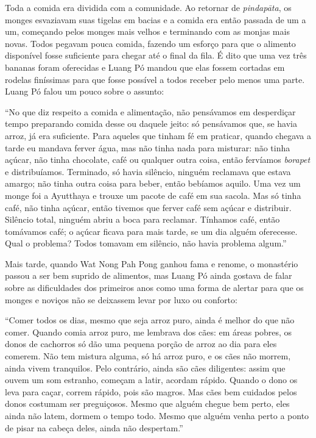 Toda a comida era dividida com a comunidade. Ao retornar de
\emph{pindapāta}, os monges esvaziavam suas tigelas em bacias e a comida
era então passada de um a um, começando pelos monges mais velhos e
terminando com as monjas mais novas. Todos pegavam pouca comida, fazendo
um esforço para que o alimento disponível fosse suficiente para chegar
até o final da fila. É dito que uma vez três bananas foram oferecidas e
Luang Pó mandou que elas fossem cortadas em rodelas finíssimas para que
fosse possível a todos receber pelo menos uma parte. Luang Pó falou um
pouco sobre o assunto:

``No que diz respeito a comida e alimentação, não pensávamos em
desperdiçar tempo preparando comida desse ou daquele jeito: só
pensávamos que, se havia arroz, já era suficiente. Para aqueles que
tinham fé em praticar, quando chegava a tarde eu mandava ferver água,
mas não tinha nada para misturar: não tinha açúcar, não tinha chocolate,
café ou qualquer outra coisa, então fervíamos \emph{borapet} e
distribuíamos. Terminado, só havia silêncio, ninguém reclamava que
estava amargo; não tinha outra coisa para beber, então bebíamos aquilo.
Uma vez um monge foi a Ayutthaya e trouxe um pacote de café em sua
sacola. Mas só tinha café, não tinha açúcar, então tivemos que ferver
café sem açúcar e distribuir. Silêncio total, ninguém abriu a boca para
reclamar. Tínhamos café, então tomávamos café; o açúcar ficava para mais
tarde, se um dia alguém oferecesse. Qual o problema? Todos tomavam em
silêncio, não havia problema algum.''

Mais tarde, quando Wat Nong Pah Pong ganhou fama e renome, o monastério
passou a ser bem suprido de alimentos, mas Luang Pó ainda gostava de
falar sobre as dificuldades dos primeiros anos como uma forma de alertar
para que os monges e noviços não se deixassem levar por luxo ou
conforto:

``Comer todos os dias, mesmo que seja arroz puro, ainda é melhor do que
não comer. Quando comia arroz puro, me lembrava dos cães: em áreas
pobres, os donos de cachorros só dão uma pequena porção de arroz ao dia
para eles comerem. Não tem mistura alguma, só há arroz puro, e os cães
não morrem, ainda vivem tranquilos. Pelo contrário, ainda são cães
diligentes: assim que ouvem um som estranho, começam a latir, acordam
rápido. Quando o dono os leva para caçar, correm rápido, pois são
magros. Mas cães bem cuidados pelos donos costumam ser preguiçosos.
Mesmo que alguém chegue bem perto, eles ainda não latem, dormem o tempo
todo. Mesmo que alguém venha perto a ponto de pisar na cabeça deles,
ainda não despertam.''

